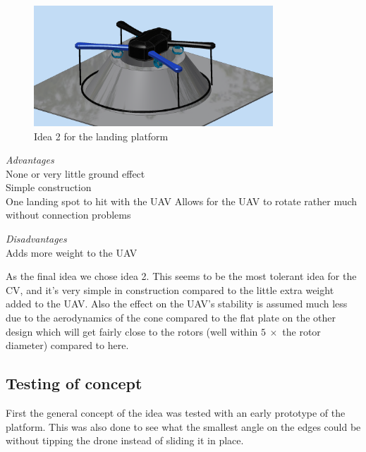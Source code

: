 \begin{figure}
	\centering
	\includegraphics[width=0.8\textwidth]{imgs/mockup_idea_1}
	\caption{Idea 2 for the landing platform}
\end{figure}
\begin{center}
	\begin{minipage}[t]{0.45\textwidth}
		\begin{flushleft}
			\emph{Advantages}\\
			None or very little ground effect\\
			Simple construction\\
			One landing spot to hit with the UAV
			Allows for the UAV to rotate rather much without connection problems
		\end{flushleft}
	\end{minipage}
	\begin{minipage}[t]{0.45\textwidth}
		\begin{flushleft}
			\emph{Disadvantages}\\
			Adds more weight to the UAV
		\end{flushleft}
	\end{minipage}
\end{center}

As the final idea we chose idea 2. This seems to be the most tolerant idea for the CV, and it's very simple in construction compared to the little extra weight added to the UAV. Also the effect on the UAV's stability is assumed much less due to the aerodynamics of the cone compared to the flat plate on the other design which will get fairly close to the rotors (well within $5~ \times$ the rotor diameter) compared to here.

\subsection{Testing of concept}
First the general concept of the idea was tested with an early prototype of the platform. This was also done to see what the smallest angle on the edges could be without tipping the drone instead of sliding it in place.

